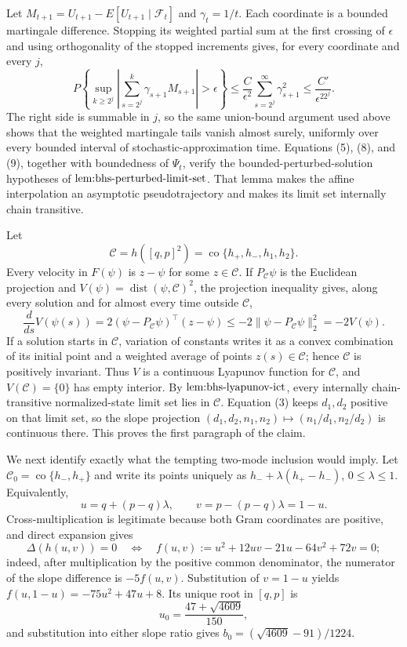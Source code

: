 Let \(M_{t+1}=U_{t+1}-E[U_{t+1}\mid\mathcal F_t]\) and \(\gamma_t=1/t\).  Each coordinate is a bounded martingale difference.  Stopping its weighted partial sum at the first crossing of \(\epsilon\) and using orthogonality of the stopped increments gives, for every coordinate and every \(j\),
\[
 P\!\left\{\sup_{k\geq2^j}\left|\sum_{s=2^j}^k\gamma_{s+1}M_{s+1}\right|>\epsilon\right\}
 \leq \frac{C}{\epsilon^2}\sum_{s=2^j}^{\infty}\gamma_{s+1}^2
 \leq\frac{C'}{\epsilon^22^j}. \tag{9}
\]
The right side is summable in \(j\), so the same union-bound argument used above shows that the weighted martingale tails vanish almost surely, uniformly over every bounded interval of stochastic-approximation time.  Equations (5), (8), and (9), together with boundedness of \(\Psi_t\), verify the bounded-perturbed-solution hypotheses of \(\textnormal{lem:bhs-perturbed-limit-set}\).  That lemma makes the affine interpolation an asymptotic pseudotrajectory and makes its limit set internally chain transitive.

Let
\[
 \mathcal C=h([q,p]^2)=\operatorname{co}\{h_+,h_-,h_1,h_2\}.
\]
Every velocity in \(F(\psi)\) is \(z-\psi\) for some \(z\in\mathcal C\).  If \(P_{\mathcal C}\psi\) is the Euclidean projection and \(V(\psi)=\operatorname{dist}(\psi,\mathcal C)^2\), the projection inequality gives, along every solution and for almost every time outside \(\mathcal C\),
\[
 \frac{d}{ds}V(\psi(s))
 =2(\psi-P_{\mathcal C}\psi)^\top(z-\psi)
 \leq-2\|\psi-P_{\mathcal C}\psi\|_2^2=-2V(\psi). \tag{10}
\]
If a solution starts in \(\mathcal C\), variation of constants writes it as a convex combination of its initial point and a weighted average of points \(z(s)\in\mathcal C\); hence \(\mathcal C\) is positively invariant.  Thus \(V\) is a continuous Lyapunov function for \(\mathcal C\), and \(V(\mathcal C)=\{0\}\) has empty interior.  By \(\textnormal{lem:bhs-lyapunov-ict}\), every internally chain-transitive normalized-state limit set lies in \(\mathcal C\).  Equation (3) keeps \(d_1,d_2\) positive on that limit set, so the slope projection \((d_1,d_2,n_1,n_2)\mapsto(n_1/d_1,n_2/d_2)\) is continuous there.  This proves the first paragraph of the claim.

We next identify exactly what the tempting two-mode inclusion would imply.  Let \(\mathcal C_0=\operatorname{co}\{h_-,h_+\}\) and write its points uniquely as \(h_-+\lambda(h_+-h_-)\), \(0\leq\lambda\leq1\).  Equivalently,
\[
 u=q+(p-q)\lambda,\qquad v=p-(p-q)\lambda=1-u. \tag{11}
\]
Cross-multiplication is legitimate because both Gram coordinates are positive, and direct expansion gives
\[
 \Delta(h(u,v))=0
 \quad\Longleftrightarrow\quad
 f(u,v):=u^2+12uv-21u-64v^2+72v=0; \tag{12}
\]
indeed, after multiplication by the positive common denominator, the numerator of the slope difference is \(-5f(u,v)\).  Substitution of \(v=1-u\) yields \(f(u,1-u)=-75u^2+47u+8\).  Its unique root in \([q,p]\) is
\[
 u_0=\frac{47+\sqrt{4609}}{150},
\]
and substitution into either slope ratio gives \(b_0=(\sqrt{4609}-91)/1224\).

